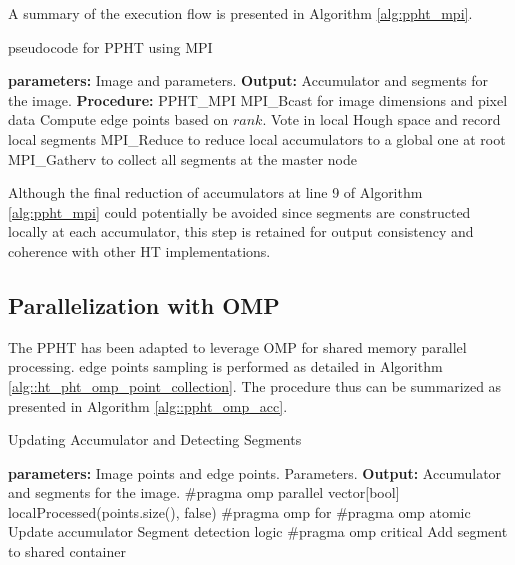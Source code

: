 \documentclass[conference]{IEEEtran}
\begin{document}
        A summary of the execution flow is presented in Algorithm \ref{alg:ppht_mpi}.
        \begin{algorithm}
            \caption{pseudocode for PPHT using MPI}
            \label{alg:ppht_mpi}
            \begin{algorithmic}[1]
            \State \textbf{parameters:}
            \State \hspace{\algorithmicindent} Image and parameters.
            \State \textbf{Output:} Accumulator and segments for the image.
            \State \textbf{Procedure:} PPHT\_MPI
            \State MPI\_Bcast for image dimensions and pixel data
            \State Compute edge points based on $rank$.
                \State Vote in local Hough space and record local segments
            \EndFor
            \State MPI\_Reduce to reduce local accumulators to a global one at root
            \State  MPI\_Gatherv to collect all segments at the master node
            \end{algorithmic}
        \end{algorithm}
        
        Although the final reduction of accumulators at line 9 of Algorithm \ref{alg:ppht_mpi} could potentially be avoided since segments are constructed locally at each accumulator, this step is retained for output consistency and coherence with other HT implementations.
        
    \subsection{Parallelization with OMP}
    \label{subsec:ppht_omp}
    
        The PPHT has been adapted to leverage OMP for shared memory parallel processing. edge points sampling is performed as detailed in Algorithm \ref{alg::ht_pht_omp_point_collection}. The procedure thus can be summarized as presented in Algorithm \ref{alg::ppht_omp_acc}.

        \begin{algorithm}
        \caption{Updating Accumulator and Detecting Segments}
        \begin{algorithmic}[1]
        \label{alg::ppht_omp_acc}
        \State \textbf{parameters:}
        \State \hspace{\algorithmicindent} Image points and edge points.
         \State \hspace{\algorithmicindent} Parameters.
        \State \textbf{Output:} Accumulator and segments for the image.
            \State \#pragma omp parallel
            \State vector[bool] localProcessed(points.size(), false)
            \State \#pragma omp for
                \State \#pragma omp atomic
                \State Update accumulator
                \State Segment detection logic
                \State \#pragma omp critical
                \State Add segment to shared container
            \EndFor
        \EndProcedure
        \end{algorithmic}
        \end{algorithm}
\end{document}

